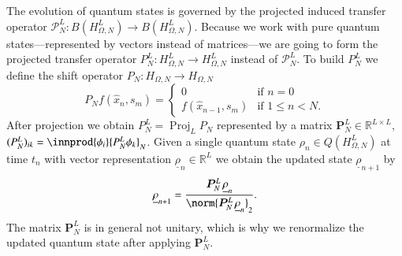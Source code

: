 \documentclass[letterpaper,10pt,3p,preprint]{elsarticle}
\newcommand{\Rbb}{\mathbb{R}}
\DeclareMathOperator{\Proj}{Proj}
\newcommand{\vect}[1]{\underline{#1}}
\newcommand{\matr}[1]{\bm{#1}}
\begin{document}
The evolution of quantum states is governed by the projected
induced transfer operator
$\mathcal{P}_N^L\colon B(H_{\Omega,N}^L)\to B(H_{\Omega,N}^L)$.
Because we work with pure quantum states---represented
by vectors instead of matrices---we are going to form
the projected transfer operator
$P_N^L\colon H_{\Omega,N}^L\to H_{\Omega,N}^L$
instead of $\mathcal{P}_N^L$.
To build $P_N^L$ we define the shift operator
$P_N\colon H_{\Omega,N}\to H_{\Omega,N}$
\begin{equation*}
    P_Nf(\hat{x}_n,s_m)=\begin{cases}
        0& \text{if $n=0$}\\
        f(\hat{x}_{n-1},s_m)& \text{if $1\leq n<N$}.
        \end{cases}
\end{equation*}
After projection we obtain
$P_N^L=\Proj_LP_N$
represented by a matrix
$\matr{P}_N^L\in\Rbb^{L\times L}$,
$(P_N^L)_{ik}=\innprod{\phi_i}{P_N^L\phi_k}_N$.
Given a single quantum state
$\rho_n\in Q(H_{\Omega,N}^L)$
at time $t_n$ with vector representation
$\vect{\rho}_n\in\Rbb^L$
we obtain the updated state $\vect{\rho}_{n+1}$
by
\begin{equation*}
    \vect{\rho}_{n+1}=\frac{\matr{P}_N^L\,\vect{\rho}_n}
        {\norm{\matr{P}_N^L\,\vect{\rho}_n}_2}.
\end{equation*}
The matrix $\matr{P}_N^L$ is in general not unitary,
which is why we renormalize the updated quantum state after applying
$\matr{P}_N^L$.
\end{document}
